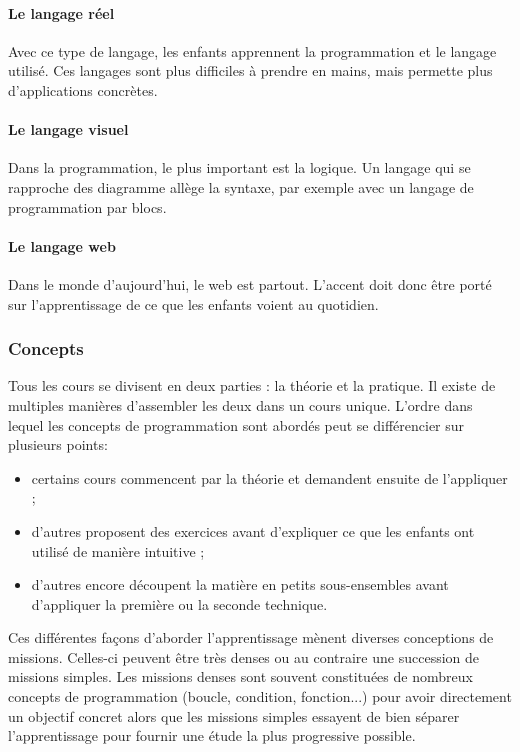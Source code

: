 \paragraph{Le langage réel} Avec ce type de langage, les enfants apprennent la programmation et le langage utilisé. Ces langages sont plus difficiles à prendre en mains, mais permette plus d'applications concrètes.
\paragraph{Le langage visuel} Dans la programmation, le plus important est la logique. Un langage qui se rapproche des diagramme allège la syntaxe, par exemple avec un langage de programmation par \glspl{bloc}.
\paragraph{Le langage web} Dans le monde d'aujourd'hui, le web est partout. L'accent doit donc être porté sur l'apprentissage de ce que les enfants voient au quotidien.


\subsubsection{Concepts}
Tous les cours se divisent en deux parties : la théorie et la pratique. Il existe de multiples manières d'assembler les deux dans un cours unique. L'ordre dans lequel les concepts de programmation sont abordés peut se différencier sur plusieurs points:
\begin{itemize}
  \item certains cours commencent par la théorie et demandent ensuite de l'appliquer ;
  \item d'autres proposent des exercices avant d'expliquer ce que les enfants ont utilisé de manière intuitive ;
  \item d'autres encore découpent la matière en petits sous-ensembles avant d'appliquer la première ou la seconde technique.\\
\end{itemize}


Ces différentes façons d'aborder l'apprentissage mènent diverses conceptions de \glspl{mission}. Celles-ci peuvent être très denses ou au contraire une succession de \glspl{mission} simples. Les \glspl{mission} denses sont souvent constituées de nombreux concepts de programmation (boucle, condition, fonction...) pour avoir directement un objectif concret alors que les \glspl{mission} simples essayent de bien séparer l'apprentissage pour fournir une étude la plus progressive possible.\\

